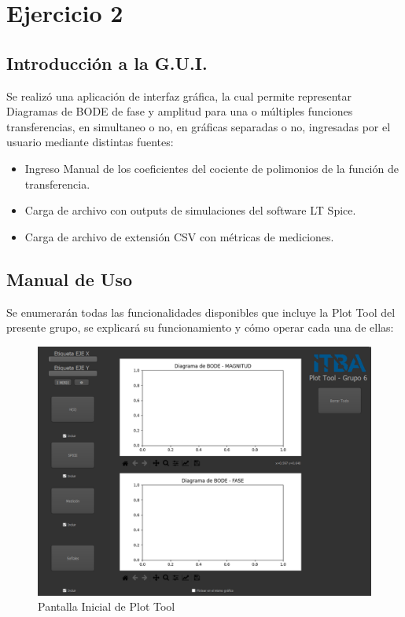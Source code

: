 \section{Ejercicio 2}

\subsection{Introducción a la G.U.I.}

Se realizó una aplicación de interfaz gráfica, la cual permite representar Diagramas de BODE de fase y amplitud para una o múltiples funciones transferencias, en simultaneo o no, en gráficas separadas o no, ingresadas por el usuario mediante distintas fuentes:

\begin{itemize}
    \item Ingreso Manual de los coeficientes del cociente de polimonios de la función de transferencia.
    \item Carga de archivo con outputs de simulaciones del software LT Spice.
    \item Carga de archivo de extensión CSV con métricas de mediciones. 

\end{itemize}

\subsection{Manual de Uso}

Se enumerarán todas las funcionalidades disponibles que incluye la Plot Tool del presente grupo, se explicará su funcionamiento y cómo operar cada una de ellas:

\begin{figure}[!htb] 
    \centering 
    \includegraphics [width=0.8
    \textwidth] {../EJ2/LatexScreenshots/plotToolVacia.png} 
    \caption{Pantalla Inicial de Plot Tool}
    \label{fig:emptyPlotTool}
\end{figure}

